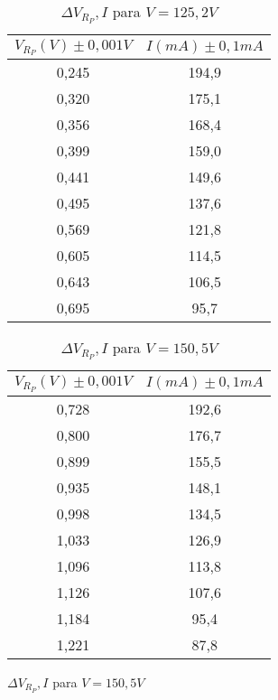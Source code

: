 \documentclass[12pt, a4paper, titlepage]{article}
\begin{document}
  \begin{figure}[H] 
    \centering
    \begin{minipage}[c]{0,45\textwidth}
      \begin{table}[H]
        \centering
        \begin{tabular}{|c|c|}
        \hline
        $V_{R_P} (V) \pm 0,001 V$    & $I (mA) \pm 0,1 mA$  \\ \hline
        0,245 & 194,9 \\ \hline
        0,320  & 175,1 \\ \hline
        0,356  & 168,4 \\ \hline
        0,399  & 159,0 \\ \hline
        0,441  & 149,6 \\ \hline
        0,495  & 137,6 \\ \hline
        0,569  & 121,8 \\ \hline
        0,605  & 114,5 \\ \hline
        0,643  & 106,5 \\ \hline
        0,695  & 95,7  \\ \hline
        \end{tabular}
        \caption{$\Delta V_{R_P}, I$ para $V = 125,2V$}
      \end{table}
    \end{minipage}
    \begin{minipage}[c]{0,45\textwidth}
      \begin{table}[H]
        \centering
        \begin{tabular}{|c|c|}
        \hline
        $V_{R_P} (V) \pm 0,001 V$    & $I (mA) \pm 0,1 mA$  \\ \hline
        0,728 & 192,6 \\ \hline
        0,800 & 176,7 \\ \hline
        0,899 & 155,5 \\ \hline
        0,935 & 148,1 \\ \hline
        0,998 & 134,5 \\ \hline
        1,033 & 126,9 \\ \hline
        1,096 & 113,8 \\ \hline
        1,126 & 107,6 \\ \hline
        1,184 & 95,4  \\ \hline
        1,221 & 87,8  \\ \hline
        \end{tabular}
        \caption{$\Delta V_{R_P}, I$ para $V = 150,5V$}
      \end{table}
    \end{minipage}
  \end{figure}
\end{document}

